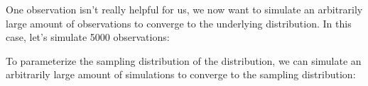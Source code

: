 \documentclass[letterpaper,10pt,english]{sphinxmanual}
\begin{document}
One observation isn’t really helpful for us, we now want to simulate an
arbitrarily large amount of observations to converge to the underlying
distribution. In this case, let’s simulate 5000 observations:

%
\begin{sphinxVerbatim}[commandchars=\\\{\}]
   
  
\end{sphinxVerbatim}

To parameterize the sampling distribution of the distribution, we can
simulate an arbitrarily large amount of simulations to converge to the
sampling distribution:
\end{document}
